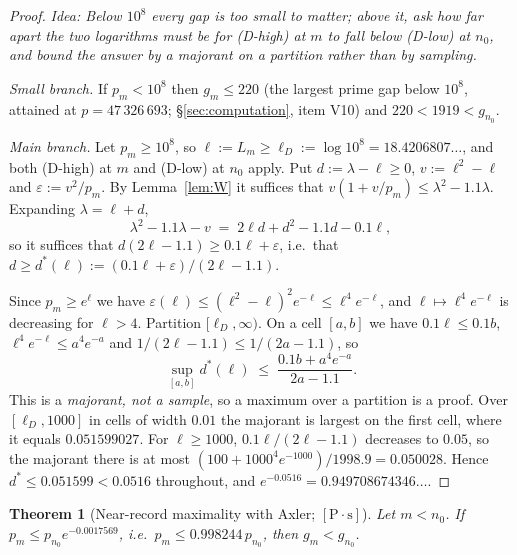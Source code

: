 \documentclass[11pt,a4paper]{article}
\theoremstyle{plain}
\newtheorem{theorem}{Theorem}[section]
\theoremstyle{definition}
\theoremstyle{remark}
\newcommand{\idea}[1]{\emph{Idea: #1}\par\smallskip}
\newcommand{\cPs}{{[\mathrm{P}\!\cdot\!\mathrm{s}]}}
\begin{document}
\begin{proof}
\idea{Below $10^8$ every gap is too small to matter; above it, ask how far apart the two
logarithms must be for (D-high) at $m$ to fall below (D-low) at $n_0$, and bound the answer by
a majorant on a partition rather than by sampling.}
\emph{Small branch.} If $p_m < 10^8$ then $g_m \le 220$ (the largest prime gap below $10^8$,
attained at $p = 47\,326\,693$; \S\ref{sec:computation}, item V10) and
$220 < 1919 < g_{n_0}$.

\emph{Main branch.} Let $p_m \ge 10^8$, so $\ell := L_m \ge \ell_D := \log 10^8 =
18.4206807\ldots$, and both (D-high) at $m$ and (D-low) at $n_0$ apply. Put $d := \lambda -
\ell \ge 0$, $v := \ell^2 - \ell$ and $\varepsilon := v^2/p_m$. By Lemma~\ref{lem:W} it
suffices that $v(1 + v/p_m) \le \lambda^2 - 1.1\lambda$. Expanding $\lambda = \ell + d$,
\[
\lambda^2 - 1.1\lambda - v \;=\; 2\ell d + d^2 - 1.1 d - 0.1\ell ,
\]
so it suffices that $d(2\ell - 1.1) \ge 0.1\ell + \varepsilon$, i.e.\ that
$d \ge d^*(\ell) := (0.1\ell + \varepsilon)/(2\ell - 1.1)$.

Since $p_m \ge e^{\ell}$ we have $\varepsilon(\ell) \le (\ell^2-\ell)^2 e^{-\ell} \le
\ell^4 e^{-\ell}$, and $\ell \mapsto \ell^4 e^{-\ell}$ is decreasing for $\ell > 4$. Partition
$[\ell_D,\infty)$. On a cell $[a,b]$ we have $0.1\ell \le 0.1b$,
$\ell^4e^{-\ell} \le a^4e^{-a}$ and $1/(2\ell-1.1) \le 1/(2a-1.1)$, so
\[
\sup_{[a,b]} d^*(\ell) \;\le\; \frac{0.1b + a^4e^{-a}}{2a - 1.1} .
\]
This is a \emph{majorant, not a sample}, so a maximum over a partition is a proof. Over
$[\ell_D, 1000]$ in cells of width $0.01$ the majorant is largest on the first cell, where it
equals $0.051599027$. For $\ell \ge 1000$, $0.1\ell/(2\ell-1.1)$ decreases to $0.05$, so the
majorant there is at most $(100 + 1000^4e^{-1000})/1998.9 = 0.050028$. Hence
$d^* \le 0.051599 < 0.0516$ throughout, and $e^{-0.0516} = 0.949708674346\ldots$.
\end{proof}

\begin{theorem}[Near-record maximality with Axler; $\cPs$]
\label{thm:Cb}
Let $m < n_0$. If $p_m \le p_{n_0}e^{-0.0017569}$, i.e.\ $p_m \le 0.998244\,p_{n_0}$, then
$g_m < g_{n_0}$.
\end{theorem}
\end{document}
